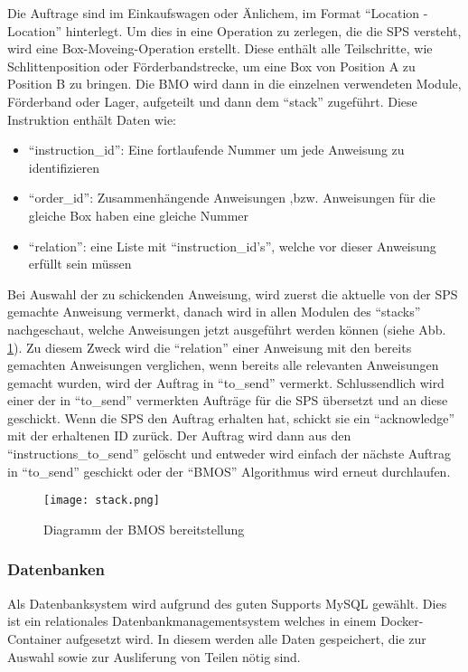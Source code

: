 Die Auftrage sind im Einkaufswagen oder Änlichem, im Format \enquote{Location -\> Location} hinterlegt. Um dies in eine Operation zu zerlegen, die die SPS versteht, wird eine Box-Moveing-Operation erstellt. Diese enthält alle Teilschritte, wie Schlittenposition oder Förderbandstrecke, um eine Box von Position A zu Position B zu bringen. 
Die BMO wird dann in die einzelnen verwendeten Module, Förderband oder Lager, aufgeteilt und dann dem \enquote{stack} zugeführt. Diese Instruktion enthält Daten wie:
\begin{itemize}
    \item \enquote{instruction\_id}: Eine fortlaufende Nummer um jede Anweisung zu identifizieren
    \item \enquote{order\_id}: Zusammenhängende Anweisungen ,bzw. Anweisungen für die gleiche Box haben eine gleiche Nummer
    \item \enquote{relation}: eine Liste mit \enquote{instruction\_id's}, welche vor dieser Anweisung erfüllt sein müssen

\end{itemize}
Bei Auswahl der zu schickenden Anweisung, wird zuerst die aktuelle von der SPS gemachte Anweisung vermerkt, danach wird in allen Modulen des \enquote{stacks} nachgeschaut, welche Anweisungen jetzt ausgeführt werden können (siehe Abb. \ref{bmos_diag}). Zu diesem Zweck wird die \enquote{relation} einer Anweisung mit den bereits gemachten Anweisungen verglichen, wenn bereits alle relevanten Anweisungen gemacht wurden, wird der Auftrag in \enquote{to\_send} vermerkt. Schlussendlich wird einer der in \enquote{to\_send} vermerkten Aufträge für die SPS übersetzt und an diese geschickt. 
Wenn die SPS den Auftrag erhalten hat, schickt sie ein \enquote{acknowledge} mit der erhaltenen ID zurück. Der Auftrag wird dann aus den \enquote{instructions\_to\_send} gelöscht und entweder wird einfach der nächste Auftrag in \enquote{to\_send} geschickt oder der \enquote{BMOS} Algorithmus wird erneut durchlaufen.

\begin{figure}[h]
    \centering
    \texttt{[image: stack.png]}
    \caption{Diagramm der BMOS bereitstellung}
    \label{bmos_diag}
\end{figure}

\subsubsection{Datenbanken}

Als Datenbanksystem wird aufgrund des guten Supports MySQL gewählt. Dies ist ein relationales Datenbankmanagementsystem welches in einem Docker-Container aufgesetzt wird. In diesem werden alle Daten gespeichert, die zur Auswahl sowie zur Ausliferung von Teilen nötig sind.

